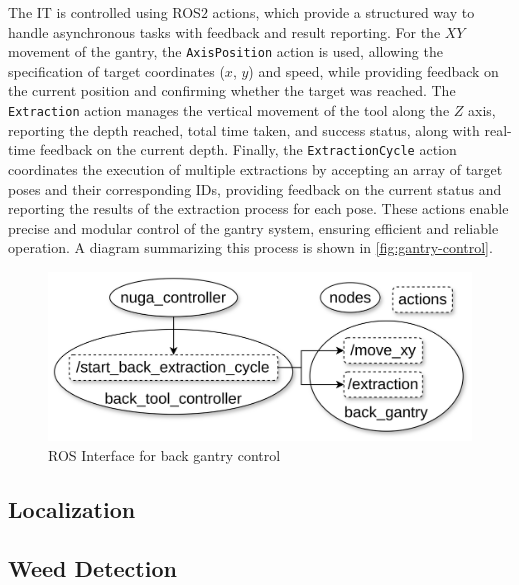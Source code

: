 The \ac{IT} is controlled using ROS$2$ actions, which provide a structured way to handle asynchronous tasks with feedback and result reporting. For the $XY$ movement of the gantry, the \texttt{AxisPosition} action is used, allowing the specification of target coordinates ($x$, $y$) and speed, while providing feedback on the current position and confirming whether the target was reached. The \texttt{Extraction} action manages the vertical movement of the tool along the $Z$ axis, reporting the depth reached, total time taken, and success status, along with real-time feedback on the current depth. Finally, the \texttt{ExtractionCycle} action coordinates the execution of multiple extractions by accepting an array of target poses and their corresponding IDs, providing feedback on the current status and reporting the results of the extraction process for each pose. These actions enable precise and modular control of the gantry system, ensuring efficient and reliable operation. A diagram summarizing this process is shown in \autoref{fig:gantry-control}.

\begin{figure}[h]
    \centering
    \includegraphics[width=0.7\linewidth]{gfx/ch02/gantry_control.png}
    \caption{ROS Interface for back gantry control}
    \label{fig:gantry-control}
\end{figure}


\subsection{Localization}
\lipsum[1]

\subsection{Weed Detection}
\lipsum[1]


